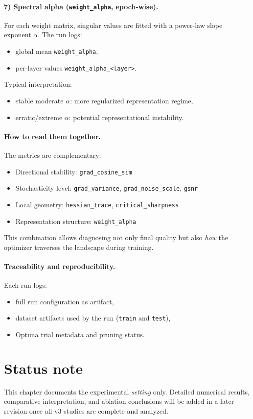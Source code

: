 \paragraph{7) Spectral alpha (\texttt{weight\_alpha}, epoch-wise).}
For each weight matrix, singular values are fitted with a power-law slope
exponent \(\alpha\). The run logs:
\begin{itemize}
    \item global mean \texttt{weight\_alpha},
    \item per-layer values \texttt{weight\_alpha\_<layer>}.
\end{itemize}
Typical interpretation:
\begin{itemize}
    \item stable moderate \(\alpha\): more regularized representation regime,
    \item erratic/extreme \(\alpha\): potential representational instability.
\end{itemize}

\paragraph{How to read them together.}
The metrics are complementary:
\begin{itemize}
    \item Directional stability: \texttt{grad\_cosine\_sim}
    \item Stochasticity level: \texttt{grad\_variance}, \texttt{grad\_noise\_scale}, \texttt{gsnr}
    \item Local geometry: \texttt{hessian\_trace}, \texttt{critical\_sharpness}
    \item Representation structure: \texttt{weight\_alpha}
\end{itemize}
This combination allows diagnosing not only final quality but also \emph{how}
the optimizer traverses the landscape during training.

\paragraph{Traceability and reproducibility.}
Each run logs:
\begin{itemize}
    \item full run configuration as artifact,
    \item dataset artifacts used by the run (\texttt{train} and \texttt{test}),
    \item Optuna trial metadata and pruning status.
\end{itemize}

\section{Status note}

This chapter documents the experimental \emph{setting} only. Detailed numerical
results, comparative interpretation, and ablation conclusions will be added in a
later revision once all v3 studies are complete and analyzed.
